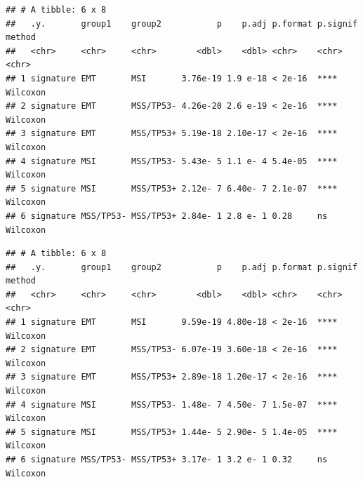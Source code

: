 \documentclass[
  12pt,
]{book}
\newenvironment{Shaded}{\begin{snugshade}}{\end{snugshade}}
\newcommand{\AttributeTok}[1]{\textcolor[rgb]{0.13,0.29,0.53}{#1}}
\newcommand{\ConstantTok}[1]{\textcolor[rgb]{0.56,0.35,0.01}{#1}}
\newcommand{\DecValTok}[1]{\textcolor[rgb]{0.00,0.00,0.81}{#1}}
\newcommand{\FunctionTok}[1]{\textcolor[rgb]{0.13,0.29,0.53}{\textbf{#1}}}
\newcommand{\NormalTok}[1]{#1}
\newcommand{\OtherTok}[1]{\textcolor[rgb]{0.56,0.35,0.01}{#1}}
\newcommand{\SpecialCharTok}[1]{\textcolor[rgb]{0.81,0.36,0.00}{\textbf{#1}}}
\newcommand{\StringTok}[1]{\textcolor[rgb]{0.31,0.60,0.02}{#1}}
\begin{document}
\begin{verbatim}
## # A tibble: 6 x 8
##   .y.       group1    group2           p    p.adj p.format p.signif method  
##   <chr>     <chr>     <chr>        <dbl>    <dbl> <chr>    <chr>    <chr>   
## 1 signature EMT       MSI       3.76e-19 1.9 e-18 < 2e-16  ****     Wilcoxon
## 2 signature EMT       MSS/TP53- 4.26e-20 2.6 e-19 < 2e-16  ****     Wilcoxon
## 3 signature EMT       MSS/TP53+ 5.19e-18 2.10e-17 < 2e-16  ****     Wilcoxon
## 4 signature MSI       MSS/TP53- 5.43e- 5 1.1 e- 4 5.4e-05  ****     Wilcoxon
## 5 signature MSI       MSS/TP53+ 2.12e- 7 6.40e- 7 2.1e-07  ****     Wilcoxon
## 6 signature MSS/TP53- MSS/TP53+ 2.84e- 1 2.8 e- 1 0.28     ns       Wilcoxon
\end{verbatim}

\begin{Shaded}
\end{Shaded}

\begin{verbatim}
## # A tibble: 6 x 8
##   .y.       group1    group2           p    p.adj p.format p.signif method  
##   <chr>     <chr>     <chr>        <dbl>    <dbl> <chr>    <chr>    <chr>   
## 1 signature EMT       MSI       9.59e-19 4.80e-18 < 2e-16  ****     Wilcoxon
## 2 signature EMT       MSS/TP53- 6.07e-19 3.60e-18 < 2e-16  ****     Wilcoxon
## 3 signature EMT       MSS/TP53+ 2.89e-18 1.20e-17 < 2e-16  ****     Wilcoxon
## 4 signature MSI       MSS/TP53- 1.48e- 7 4.50e- 7 1.5e-07  ****     Wilcoxon
## 5 signature MSI       MSS/TP53+ 1.44e- 5 2.90e- 5 1.4e-05  ****     Wilcoxon
## 6 signature MSS/TP53- MSS/TP53+ 3.17e- 1 3.2 e- 1 0.32     ns       Wilcoxon
\end{verbatim}
\end{document}
